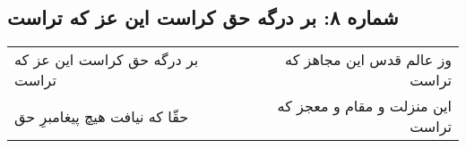 \begin{center}
\section*{شماره ۸: بر درگه حق کراست این عز که تراست}
\label{sec:008}
\begin{longtable}{l p{0.5cm} r}
بر درگه حق کراست این عز که تراست
&&
وز عالم قدس این مجاهز که تراست
\\
حقّا که نیافت هیچ پیغامبرِ حق
&&
این منزلت و مقام و معجز که تراست
\\
\end{longtable}
\end{center}
